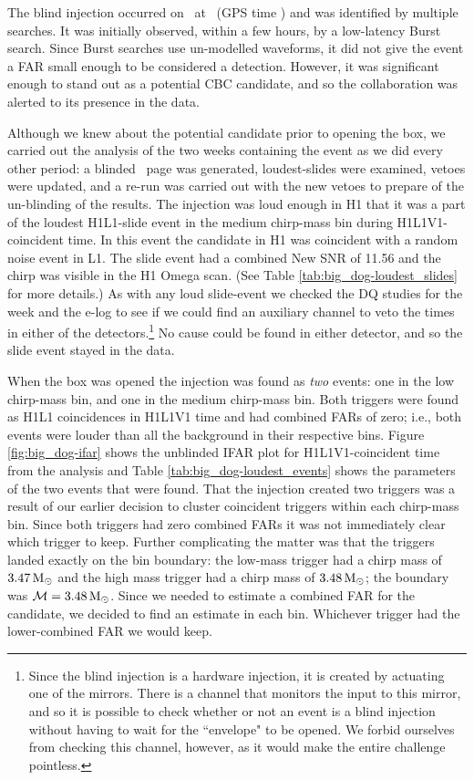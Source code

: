The blind injection occurred on \dogDate~at \injectedDogTime~(GPS time
\injectedDogGPSTime) and was identified by multiple searches. It was initially
observed, within a few hours, by a low-latency Burst search. Since Burst
searches use un-modelled waveforms, it did not give the event a \ac{FAR} small
enough to be considered a detection. However, it was significant enough to stand
out as a potential \ac{CBC} candidate, and so the collaboration was alerted to
its presence in the data.

Although we knew about the potential candidate prior to opening the box, we
carried out the analysis of the two weeks containing the event as we did every
other period: a blinded \ihope~page was generated, loudest-slides were
examined, vetoes were updated, and a re-run was carried out with the new vetoes
to prepare of the un-blinding of the results. The injection was loud enough in
H1 that it was a part of the loudest H1L1-slide event in the medium chirp-mass
bin during H1L1V1-coincident time. In this event the candidate in H1 was
coincident with a random noise event in L1. The slide event had a combined New
\ac{SNR} of 11.56 and the chirp was visible in the H1 Omega scan. (See Table
\ref{tab:big_dog-loudest_slides} for more details.) As with any loud
slide-event we checked the \ac{DQ} studies for the week and the e-log to see if
we could find an auxiliary channel to veto the times in either of the
detectors.\footnote{Since the blind injection is a hardware injection, it is
created by actuating one of the mirrors. There is a channel that monitors the
input to this mirror, and so it is possible to check whether or not an event is
a blind injection without having to wait for the ``envelope" to be opened. We
forbid ourselves from checking this channel, however, as it would make the
entire challenge pointless.} No cause could be found in either detector, and so
the slide event stayed in the data.

When the box was opened the injection was found as \emph{two} events: one in
the low chirp-mass bin, and one in the medium chirp-mass bin. Both triggers
were found as H1L1 coincidences in H1L1V1 time and had combined \acp{FAR} of
zero; i.e., both events were louder than all the background in their respective
bins. Figure \ref{fig:big_dog-ifar} shows the unblinded IFAR plot for
H1L1V1-coincident time from the analysis and Table
\ref{tab:big_dog-loudest_events} shows the parameters of the two events that
were found. That the injection created two triggers was a result of our earlier
decision to cluster coincident triggers within each chirp-mass bin. Since both
triggers had zero combined \acp{FAR} it was not immediately clear which trigger
to keep. Further complicating the matter was that the triggers landed exactly
on the bin boundary: the low-mass trigger had a chirp mass of $3.47\,\mathrm{M_\odot}$ and
the high mass trigger had a chirp mass of $3.48\,\mathrm{M_\odot}$; the boundary was
$\mathcal{M} = 3.48\,\mathrm{M_\odot}$. Since we needed to estimate a combined \ac{FAR} for
the candidate, we decided to find an estimate in each bin. Whichever trigger had
the lower-combined \ac{FAR} we would keep.

